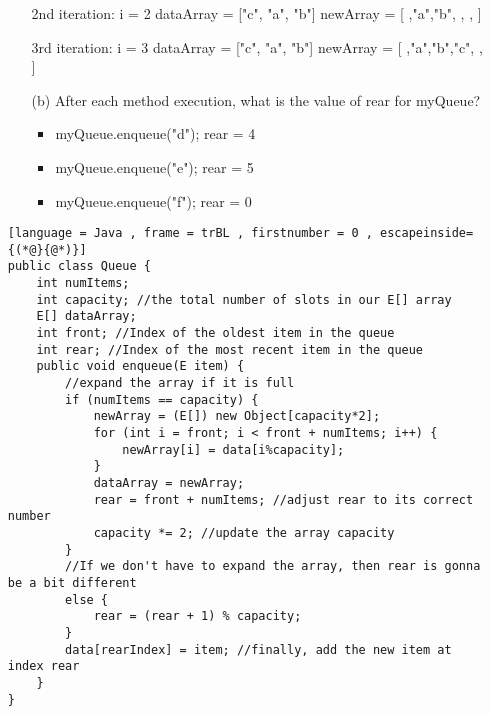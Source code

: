 \documentclass[letter]{article}
\begin{document}
\begin{enumerate}[1.]
\begin{itemize}
        2nd iteration: i = 2
        dataArray = ["c", "a", "b"]
        newArray = [  ,"a","b",  ,  ,  ]

        3rd iteration: i = 3
        dataArray = ["c", "a", "b"]
        newArray = [  ,"a","b","c",  ,  ]
        
        \item [(b)] After each method execution, what is the value of rear for myQueue?
            \begin{itemize}
                \item myQueue.enqueue("d"); rear = 4
                \item myQueue.enqueue("e"); rear = 5
                \item myQueue.enqueue("f"); rear = 0
            \end{itemize}
        
    \end{itemize} 

    \begin{lstlisting}[language = Java , frame = trBL , firstnumber = 0 , escapeinside={(*@}{@*)}]
public class Queue {
    int numItems;
    int capacity; //the total number of slots in our E[] array
    E[] dataArray;
    int front; //Index of the oldest item in the queue
    int rear; //Index of the most recent item in the queue
    public void enqueue(E item) {
        //expand the array if it is full
        if (numItems == capacity) {
            newArray = (E[]) new Object[capacity*2];
            for (int i = front; i < front + numItems; i++) {
                newArray[i] = data[i%capacity];
            }
            dataArray = newArray;
            rear = front + numItems; //adjust rear to its correct number
            capacity *= 2; //update the array capacity
        }
        //If we don't have to expand the array, then rear is gonna be a bit different
        else {
            rear = (rear + 1) % capacity;
        }
        data[rearIndex] = item; //finally, add the new item at index rear
    }
}

    \end{lstlisting}
\end{enumerate}
\end{document}
